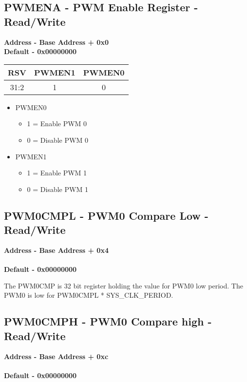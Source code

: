 \documentclass[12pt,a4paper]{report}
\begin{document}
\subsection{PWMENA - PWM Enable Register - Read/Write}
\hspace{1.6cm}
\textbf{Address - Base Address + 0x0} 
\\
\textbf{Default - 0x00000000}

\begin{center}
\begin{tabular}{|c|c|c| } 
 \hline
RSV & PWMEN1    & PWMEN0 \\ 
\hline
31:2 & 1 & 0\\
 \hline
\end{tabular}
\end{center}

\begin{itemize}
\item PWMEN0
\begin{itemize}
\item 1 = Enable PWM 0
\item 0 = Disable PWM 0
\end{itemize}
\item PWMEN1
\begin{itemize}
\item 1 = Enable PWM 1
\item 0 = Disable PWM 1
\end{itemize}
\end{itemize}


\subsection{PWM0CMPL - PWM0 Compare Low - Read/Write}
\hspace{1.6cm}
\textbf{Address - Base Address + 0x4}
\\
\\
\textbf{Default - 0x00000000}

The PWM0CMP is 32 bit register holding the value for PWM0 low period. The PWM0 is low for PWM0CMPL * SYS\_CLK\_PERIOD.

\subsection{PWM0CMPH - PWM0 Compare high - Read/Write}
\hspace{1.6cm}
\textbf{Address - Base Address + 0xc}
\\
\\
\textbf{Default - 0x00000000}
\end{document}
